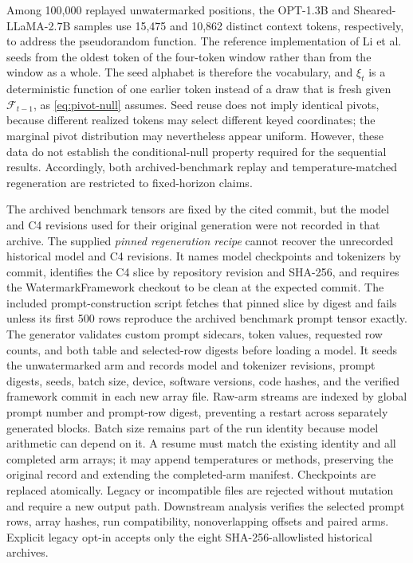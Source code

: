 \documentclass[11pt]{article}
\newcommand{\F}{\mathcal F}
\begin{document}
Among 100,000 replayed unwatermarked positions, the OPT-1.3B and
Sheared-LLaMA-2.7B samples use 15,475 and 10,862 distinct context tokens,
respectively, to address the pseudorandom function.  The reference implementation of Li et al.
seeds from the oldest token of the four-token window rather than from the
window as a whole.  The seed alphabet is therefore the vocabulary, and $\xi_t$
is a deterministic function of one earlier token instead of a draw that is
fresh given $\F_{t-1}$, as \eqref{eq:pivot-null} assumes.  Seed reuse does not
imply identical pivots, because different realized tokens may select different
keyed coordinates; the marginal pivot distribution may nevertheless appear
uniform.  However, these data do not establish the conditional-null property
required for the sequential results.  Accordingly, both archived-benchmark replay
and temperature-matched regeneration are restricted to fixed-horizon claims.

The archived benchmark tensors are fixed by the cited commit, but the model and C4
revisions used for their original generation were not recorded in that archive.
The supplied \emph{pinned regeneration recipe} cannot recover the unrecorded
historical model and C4 revisions.  It names model checkpoints and tokenizers by commit, identifies the C4
slice by repository revision and SHA-256, and requires the WatermarkFramework checkout
to be clean at the expected commit.  The included prompt-construction script
fetches that pinned slice by digest and fails unless its first 500 rows
reproduce the archived benchmark prompt tensor exactly.  The generator validates custom
prompt sidecars, token values, requested row counts, and both table and selected-row
digests before loading a model.  It seeds the unwatermarked arm and records
model and tokenizer revisions, prompt digests, seeds, batch size, device,
software versions, code hashes, and the verified framework commit in each new
array file. Raw-arm streams are indexed by global prompt number and prompt-row
digest, preventing a restart across separately generated blocks. Batch size
remains part of the run identity because model arithmetic can depend on it.  A resume must match the existing identity and all completed
arm arrays; it may append temperatures or methods, preserving the original
record and extending the completed-arm manifest.  Checkpoints are replaced
atomically.  Legacy or incompatible files are rejected without mutation and
require a new output path. Downstream analysis verifies the selected prompt
rows, array hashes, run compatibility, nonoverlapping offsets and paired arms.
Explicit legacy opt-in accepts only the eight SHA-256-allowlisted historical
archives.
\end{document}
